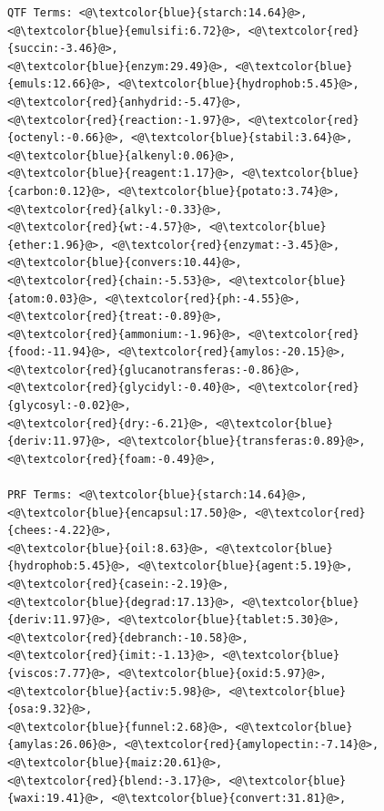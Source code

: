 \begin{figure}[htpb]
\begin{framed}
\begin{lstlisting}[basicstyle=\scriptsize\ttfamily , linewidth=\columnwidth,breaklines=true]
QTF Terms: <@\textcolor{blue}{starch:14.64}@>, <@\textcolor{blue}{emulsifi:6.72}@>, <@\textcolor{red}{succin:-3.46}@>, 
<@\textcolor{blue}{enzym:29.49}@>, <@\textcolor{blue}{emuls:12.66}@>, <@\textcolor{blue}{hydrophob:5.45}@>, <@\textcolor{red}{anhydrid:-5.47}@>, 
<@\textcolor{red}{reaction:-1.97}@>, <@\textcolor{red}{octenyl:-0.66}@>, <@\textcolor{blue}{stabil:3.64}@>, <@\textcolor{blue}{alkenyl:0.06}@>, 
<@\textcolor{blue}{reagent:1.17}@>, <@\textcolor{blue}{carbon:0.12}@>, <@\textcolor{blue}{potato:3.74}@>, <@\textcolor{red}{alkyl:-0.33}@>, 
<@\textcolor{red}{wt:-4.57}@>, <@\textcolor{blue}{ether:1.96}@>, <@\textcolor{red}{enzymat:-3.45}@>, <@\textcolor{blue}{convers:10.44}@>, 
<@\textcolor{red}{chain:-5.53}@>, <@\textcolor{blue}{atom:0.03}@>, <@\textcolor{red}{ph:-4.55}@>, <@\textcolor{red}{treat:-0.89}@>, 
<@\textcolor{red}{ammonium:-1.96}@>, <@\textcolor{red}{food:-11.94}@>, <@\textcolor{red}{amylos:-20.15}@>, 
<@\textcolor{red}{glucanotransferas:-0.86}@>, <@\textcolor{red}{glycidyl:-0.40}@>, <@\textcolor{red}{glycosyl:-0.02}@>, 
<@\textcolor{red}{dry:-6.21}@>, <@\textcolor{blue}{deriv:11.97}@>, <@\textcolor{blue}{transferas:0.89}@>, <@\textcolor{red}{foam:-0.49}@>, 

PRF Terms: <@\textcolor{blue}{starch:14.64}@>, <@\textcolor{blue}{encapsul:17.50}@>, <@\textcolor{red}{chees:-4.22}@>, 
<@\textcolor{blue}{oil:8.63}@>, <@\textcolor{blue}{hydrophob:5.45}@>, <@\textcolor{blue}{agent:5.19}@>, <@\textcolor{red}{casein:-2.19}@>, 
<@\textcolor{blue}{degrad:17.13}@>, <@\textcolor{blue}{deriv:11.97}@>, <@\textcolor{blue}{tablet:5.30}@>, <@\textcolor{red}{debranch:-10.58}@>, 
<@\textcolor{red}{imit:-1.13}@>, <@\textcolor{blue}{viscos:7.77}@>, <@\textcolor{blue}{oxid:5.97}@>, <@\textcolor{blue}{activ:5.98}@>, <@\textcolor{blue}{osa:9.32}@>, 
<@\textcolor{blue}{funnel:2.68}@>, <@\textcolor{blue}{amylas:26.06}@>, <@\textcolor{red}{amylopectin:-7.14}@>, <@\textcolor{blue}{maiz:20.61}@>, 
<@\textcolor{red}{blend:-3.17}@>, <@\textcolor{blue}{waxi:19.41}@>, <@\textcolor{blue}{convert:31.81}@>, 


\end{lstlisting}
\end{framed}
\end{figure}
